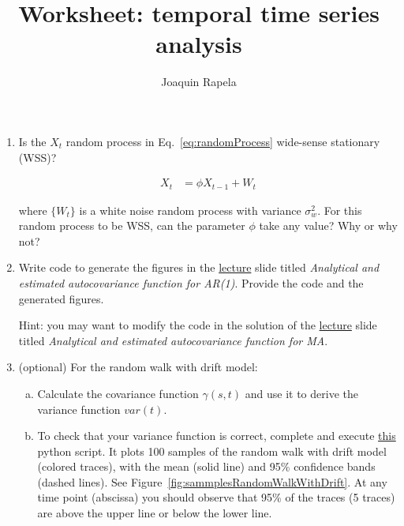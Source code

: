 \documentclass[12pt]{article}
\title{Worksheet: temporal time series analysis}
\author{Joaquin Rapela}
\begin{document}
\maketitle

\begin{enumerate}

    \item Is the $X_t$ random process in Eq.~\ref{eq:randomProcess} wide-sense
        stationary (WSS)?

        \begin{align}
            X_t & = \phi X_{t-1} + W_t\label{eq:randomProcess}
        \end{align}

        where $\{W_t\}$ is a white noise random process with variance
        $\sigma^2_w$. For this random process to be WSS, can the parameter
        $\phi$ take any value? Why or why not?

    \item Write code to generate the figures in the
        \href{https://github.com/joacorapela/statNeuro2025/blob/master/lectures/01_temporalTimeSeriesAnalysis/temporalTimeSeriesAnalysis.pdf}{lecture}
        slide titled \emph{Analytical and estimated autocovariance function for
        AR(1)}. Provide the code and the generated figures.

        Hint: you may want to modify the code in the solution of the
        \href{https://github.com/joacorapela/statNeuro2025/blob/master/lectures/01_temporalTimeSeriesAnalysis/temporalTimeSeriesAnalysis.pdf}{lecture}
        slide titled \emph{Analytical and estimated autocovariance function for MA}.

    \item (optional) For the random walk with drift model:

        \begin{enumerate}[(a)]

            \item Calculate the covariance function $\gamma(s, t)$ and use it
                to derive the variance function $var(t)$.

            \item To check that your variance function is correct, complete and
                execute \href{}{this} python script. It plots 100 samples of
                the random walk with drift model (colored traces), with the
                mean (solid line) and 95\%
                confidence bands (dashed lines). See
                Figure~\ref{fig:sammplesRandomWalkWithDrift}. At any time point
                (abscissa) you should observe that 95\% of the traces (5
                traces) are above the upper line or below the lower line.


\end{enumerate}
\end{enumerate}
\end{document}
